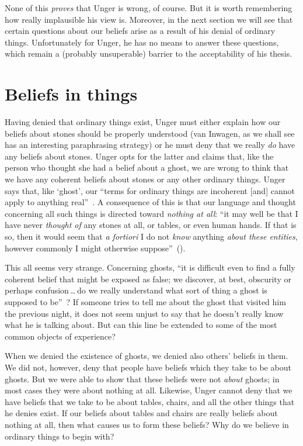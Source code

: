 \documentclass[11pt]{standalone} \newif\ifstandlone \standalonetrue
\begin{document}
\begin{spacing}{1.5}
None of this {\em proves} that Unger is wrong, of course.  But it is
worth remembering how really implausible his view is.  Moreover, in
the next section we will see that certain questions about our beliefs
arise as a result of his denial of ordinary things.  Unfortunately for
Unger, he has no means to answer these questions, which remain a
(probably unsuperable) barrier to the acceptability of his thesis.

\section{Beliefs in things}
Having denied that ordinary things exist, Unger must either explain
how our beliefs about stones should be properly understood (van
Inwagen, as we shall see has an interesting paraphrasing strategy) or
he must deny that we really {\em do} have any beliefs about stones.
Unger opts for the latter and claims that, like the person who thought
she had a belief about a ghost, we are wrong to think that we have
any coherent beliefs about stones or any other ordinary things.  Unger
says that, like `ghost', our ``terms for ordinary things are
incoherent [and] cannot apply to anything
real''~\citep[147]{unger1979}.  A consequence of this is that our
language and thought concerning all such things is directed toward
{\em nothing at all}: ``it may well be that I have never {\em thought
  of} any stones at all, or tables, or even human hands.  If that is
so, then it would seem that {\em a fortiori} I do not {\em know}
anything {\em about these entities}, however commonly I might
otherwise suppose''~(\citeyear[458]{unger1980a}).

This all seems very strange.  Concerning ghosts, ``it is difficult
even to find a fully coherent belief that might be exposed as false;
we discover, at best, obscurity or perhaps confusion\,\ldots\,do we
really understand what sort of thing a ghost is supposed to
be''~\citep[76]{stroud2000a}?  If someone tries to tell me about the
ghost that visited him the previous night, it does not seem unjust to
say that he doesn't really know what he is talking about.  But can
this line be extended to some of the most common objects of
experience?

When we denied the existence of ghosts, we denied also others' beliefs
in them.  We did not, however, deny that people have beliefs which
they take to be about ghosts.  But we were able to show that these
beliefs were not {\em about} ghosts; in most cases they were about
nothing at all.  Likewise, Unger cannot deny that we have beliefs that
we take to be about tables, chairs, and all the other things that he
denies exist.  If our beliefs about tables and chairs are really
beliefs about nothing at all, then what causes us to form these
beliefs?  Why do we believe in ordinary things to begin with?


\end{spacing}
\end{document}

